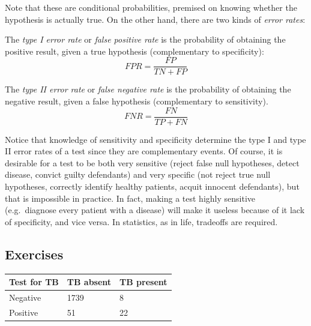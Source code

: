 \documentclass[
  letterpaper,
  DIV=11,
  numbers=noendperiod]{scrreprt}
\begin{document}
Note that these are conditional probabilities, premised on knowing
whether the hypothesis is actually true. On the other hand, there are
two kinds of \emph{error rates}:

\begin{tcolorbox}[enhanced jigsaw, coltitle=black, arc=.35mm, opacitybacktitle=0.6, breakable, bottomtitle=1mm, toptitle=1mm, titlerule=0mm, colback=white, leftrule=.75mm, rightrule=.15mm, colframe=quarto-callout-note-color-frame, colbacktitle=quarto-callout-note-color!10!white, opacityback=0, title=\textcolor{quarto-callout-note-color}{\faInfo}\hspace{0.5em}{Definition}, left=2mm, toprule=.15mm, bottomrule=.15mm]

The \emph{type I error rate} or \emph{false positive rate} is the
probability of obtaining the positive result, given a true hypothesis
(complementary to specificity): \[FPR = \frac{FP}{TN+FP}\]

The \emph{type II error rate} or \emph{false negative rate} is the
probability of obtaining the negative result, given a false hypothesis
(complementary to sensitivity). \[FNR = \frac{FN}{TP+FN}\]

\end{tcolorbox}

Notice that knowledge of sensitivity and specificity determine the type
I and type II error rates of a test since they are complementary events.
Of course, it is desirable for a test to be both very sensitive (reject
false null hypotheses, detect disease, convict guilty defendants) and
very specific (not reject true null hypotheses, correctly identify
healthy patients, acquit innocent defendants), but that is impossible in
practice. In fact, making a test highly sensitive (e.g.~diagnose every
patient with a disease) will make it useless because of it lack of
specificity, and vice versa. In statistics, as in life, tradeoffs are
required.

\hypertarget{exercises-16}{%
\subsection{Exercises}\label{exercises-16}}

\begin{longtable}[]{@{}lll@{}}
\toprule()
Test for TB & TB absent & TB present \\
\midrule()
\endhead
Negative & 1739 & 8 \\
Positive & 51 & 22 \\
\bottomrule()
\end{longtable}
\end{document}

